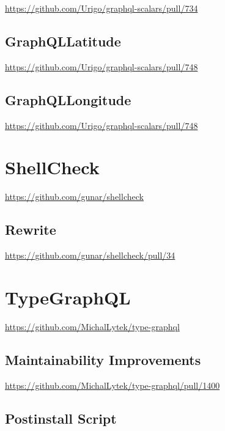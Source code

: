 \url{https://github.com/Urigo/graphql-scalars/pull/734}

\subsection{GraphQLLatitude}
\label{subsec:contributions_graphql_scalars_graphqllatitude}

\url{https://github.com/Urigo/graphql-scalars/pull/748}

\subsection{GraphQLLongitude}
\label{subsec:contributions_graphql_scalars_graphqllongitude}

\url{https://github.com/Urigo/graphql-scalars/pull/748}

\section{ShellCheck}
\label{sec:contributions_shellcheck}

\url{https://github.com/gunar/shellcheck}

\subsection{Rewrite}
\label{subsec:contributions_shellcheck_rewrite}

\url{https://github.com/gunar/shellcheck/pull/34}

\section{TypeGraphQL}
\label{sec:contributions_typegraphql}

\url{https://github.com/MichalLytek/type-graphql}

\subsection{Maintainability Improvements}
\label{subsec:contributions_typegraphql_maintainability_improvements}

\url{https://github.com/MichalLytek/type-graphql/pull/1400}

\subsection{Postinstall Script}
\label{subsec:contributions_typegraphql_postinstall_script}

